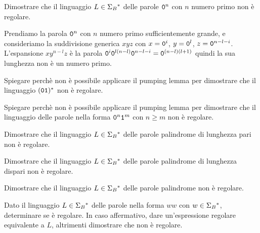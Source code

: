 \begin{Exercise}\label{exe:pump-primi}
Dimostrare che il linguaggio $L\in\Sigma_{B}{}^{\ast}$ delle parole $\mathtt{0}^{n}$ con $n$ numero primo
non è regolare.
\end{Exercise}

\begin{Answer}
Prendiamo la parola $\mathtt{0}^{n}$ con $n$ numero primo sufficientemente grande, e consideriamo la suddivisione generica
$xyz$ con $x=\mathtt{0}^{i}$, $y=\mathtt{0}^{l}$, $z=\mathtt{0}^{n-l-i}$.
L'espansione $xy^{n-l}z$ è la parola $\mathtt{0}^{i}\mathtt{0}^{l(n-l)}\mathtt{0}^{n-l-i} = \mathtt{0}^{(n-l)(l+1)}$ quindi la sua lunghezza
non è un numero primo.
\end{Answer}


\begin{Exercise}\label{exe:pump-regolare}
Spiegare perchè non è possibile applicare il pumping lemma per dimostrare che il linguaggio  $(\mathtt{0}\mathtt{1}){}^{\ast}$ non è
regolare.
\end{Exercise}

\begin{Exercise}\label{exe:pump-tanti-0}
Spiegare perchè non è possibile applicare il pumping lemma per dimostrare che il linguaggio delle parole nella forma
$\mathtt{0}^n\mathtt{1}^m$ con $n\geq m$ non è regolare.
\end{Exercise}


\begin{Exercise}\label{exe:pump-palindromi-pari}
Dimostrare che il linguaggio $L\in\Sigma_{B}{}^{\ast}$ delle parole palindrome di lunghezza pari
non è regolare.
\end{Exercise}

\begin{Exercise}\label{exe:pump-palindromi-dispari}
Dimostrare che il linguaggio $L\in\Sigma_{B}{}^{\ast}$ delle parole palindrome di lunghezza dispari
non è regolare.
\end{Exercise}

\begin{Exercise}\label{exe:pump-palindromi}
Dimostrare che il linguaggio $L\in\Sigma_{B}{}^{\ast}$ delle parole palindrome
non è regolare.
\end{Exercise}



\begin{Exercise}\label{exe:pump-copie}
Dato il linguaggio $L\in\Sigma_{B}{}^{\ast}$ delle parole nella forma $ww$ con $w\in\Sigma_{B}{}^{\ast}$, determinare se è
regolare.
In  caso affermativo, dare un'espressione regolare equivalente a $L$, altrimenti dimostrare che non è regolare.
\end{Exercise}

